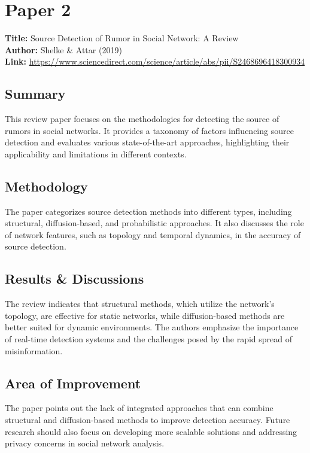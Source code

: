 \section{Paper 2}
\textbf{Title:} Source Detection of Rumor in Social Network: A Review \\
\textbf{Author:} Shelke \& Attar (2019) \\
\textbf{Link:} \url{https://www.sciencedirect.com/science/article/abs/pii/S2468696418300934}

\subsection{Summary}

This review paper focuses on the methodologies for detecting the source of rumors in social networks. It provides a taxonomy of factors influencing source detection and evaluates various state-of-the-art approaches, highlighting their applicability and limitations in different contexts.

\subsection{Methodology}

The paper categorizes source detection methods into different types, including structural, diffusion-based, and probabilistic approaches. It also discusses the role of network features, such as topology and temporal dynamics, in the accuracy of source detection.

\subsection{Results \& Discussions}

The review indicates that structural methods, which utilize the network's topology, are effective for static networks, while diffusion-based methods are better suited for dynamic environments. The authors emphasize the importance of real-time detection systems and the challenges posed by the rapid spread of misinformation.

\subsection{Area of Improvement}

The paper points out the lack of integrated approaches that can combine structural and diffusion-based methods to improve detection accuracy. Future research should also focus on developing more scalable solutions and addressing privacy concerns in social network analysis.

